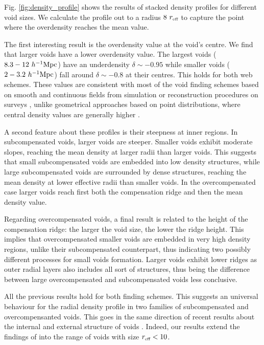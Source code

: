 \documentclass[a4,useAMS,usenatbib,usegraphicx]{mn2e}
\newcommand{\hMpc}{{\ifmmode{h^{-1}{\rm Mpc}}\else{$h^{-1}$Mpc}\fi}}
\newcommand{\reff}{{\ifmmode{r_{\mbox{\tiny eff}}}\else{$r_{\mbox{\tiny eff}}$}\fi}}
\begin{document}
Fig. \ref{fig:density_profile} shows the results of stacked density
profiles for different void sizes.  
We calculate the profile out to a radius $8\ \reff$  to capture the
point where the overdensity reaches the mean value.


The first interesting result is the overdensity value at the void's
centre.
We find that larger voids have a lower overdensity value.
The largest voids ($8.3-12\ \hMpc$) have an underdensity
$\delta \sim-0.95$ while smaller voids  ($2-3.2\ \hMpc$) fall around $\delta\sim 
-0.8$ at their centres.
This holds for both web schemes. 
These values are consistent with most of the void finding schemes
based on smooth and continuous fields from simulation or
reconstruction procedures on surveys \citep{Plionis02, Colberg05,
  Shandarin06,  Platen07, Neyrinck08, MunozCuartas11, Ceccarelli13,
  Paz13, Neyrinck13, Ricciardelli2013}, unlike geometrical approaches based 
on point distributions, where central density values are generally higher
\citep{Colberg08}. 


A second feature about these profiles is their steepness at inner
regions.  
In subcompensated voids, larger voids are steeper.
Smaller voids exhibit moderate slopes, reaching the mean density at
larger radii than larger voids.
This suggests that small subcompensated voids are embedded into low
density structures, while large subcompensated voids are surrounded
by dense structures, reaching the mean density at lower effective
radii than smaller voids. 
In the overcompensated case larger voids reach first  both the
compensation ridge and then the mean density value.  


Regarding overcompensated voids, a final result is related to the height 
of the compensation ridge: the larger the void size, the lower the ridge
height. This implies that overcompensated smaller voids are embedded in 
very high density regions, unlike their subcompensated counterpart, thus 
indicating two possibly different processes for small voids formation. 
Larger voids exhibit lower ridges as outer radial layers also includes all
sort of structures, thus being the difference between large overcompensated
and subcompensated voids less conclusive.

All the previous results hold for both finding schemes.
This suggests an universal behaviour for the radial density profile in
two families of subcompensated and overcompensanted voids. 
This goes in the same direction of recent results about the internal
\citep{Colberg05,  Ricciardelli2013} and external structure of voids
\citep{Lavaux12, Ceccarelli13, Paz13, Hamaus14}. 
Indeed, our results extend the findings of \cite{Hamaus14} into the
range of voids with size $\reff <10$\hMpc.  
 
\end{document}
